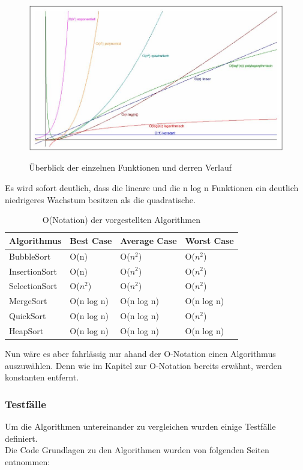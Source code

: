\documentclass{article}
\begin{document}
\begin{figure} [h]
\centering
\includegraphics [width=\linewidth]{OWachstum.JPG} \label{fig:WachstumONotation}
\caption{Überblick der einzelnen Funktionen und derren Verlauf \cite{Rehn2006Sortieralgorithmen}}
\end{figure}
Es wird sofort deutlich, dass die lineare und die n log n Funktionen ein deutlich niedrigeres Wachstum besitzen als die quadratische. 

\begin{table}[h]
\centering
\begin{tabular}{llll}
	\hline
	\textbf{Algorithmus} & \textbf{Best Case} & \textbf{Average Case} & \textbf{Worst Case} \\
	\hline
	BubbleSort & O(n) & O($n^{2}$) & O($n^{2}$) \\
InsertionSort & O(n) & O($n^{2}$) & O($n^{2}$) \\
SelectionSort & O($n^{2}$) & O($n^{2}$) & O($n^{2}$) \\
MergeSort & O(n log n) & O(n log n) & O(n log n) \\
QuickSort & O(n log n) & O(n log n) & O($n^{2}$) \\
HeapSort & O(n log n) & O(n log n) & O(n log n) \\
	\hline
\end{tabular}
\caption{O(Notation) der vorgestellten Algorithmen \cite{India2015Dataset}}
\label{tab:HeapSort}
\end{table}
Nun wäre es aber fahrlässig nur ahand der O-Notation einen Algorithmus auszuwählen. Denn wie im Kapitel zur O-Notation bereits erwähnt, werden konstanten entfernt.  

\subsubsection{Testfälle}
Um die Algorithmen untereinander zu vergleichen wurden einige Testfälle definiert.\\ 
Die Code Grundlagen zu den Algorithmen wurden von folgenden Seiten entnommen: \cite{bubbleSortCode,selectionSortCode,insertionSortCode,mergeSortCode,quickSortCode,heapSortCode}\\\\
\end{document}
